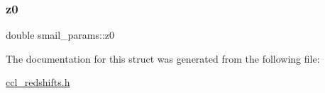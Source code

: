 \mbox{\label{structsmail__params_a41e25302d48c03f63cfdfcae8c19789a}} 
\subsubsection{\texorpdfstring{z0}{z0}}
{\footnotesize\ttfamily double smail\+\_\+params\+::z0}



The documentation for this struct was generated from the following file\+:\begin{DoxyCompactItemize}
\item 
\mbox{\hyperlink{ccl__redshifts_8h}{ccl\+\_\+redshifts.\+h}}\end{DoxyCompactItemize}

